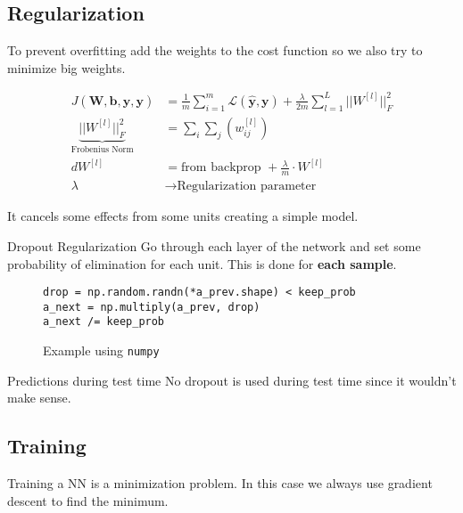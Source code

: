 \subsection{Regularization}
\begin{frame}{\insertsubsec}
    To prevent overfitting add the weights to the cost function so we also try to minimize
    big weights.

    \begin{align*}
        J(\bm{W}, \bm{b}, \hat{\bm{y}}, \bm{y}) &= 
        \frac{1}{m} \sum_{i = 1}^m \mathcal{L}(\hat{\bm{y}}, \bm{y}) + 
        \frac{\lambda}{2m} \sum_{l=1}^L ||W^{[l]}||^2_F \\ 
        \underbrace{||W^{[l]}||^2_F}_{\text{Frobenius Norm}} &= \sum_i \sum_j (w_{ij}^{[l]}) \\ 
        dW^{[l]} &= \text{from backprop } + \frac{\lambda}{m} \cdot W^{[l]} \\
        \lambda &\rightarrow \text{Regularization parameter}
    \end{align*}

    It cancels some effects from some units creating a simple model.
\end{frame}
\begin{frame}[fragile]{Dropout Regularization}
    Go through each layer of the network and set some probability of elimination for each unit. 
    This is done for \textbf{each sample}.

    \begin{figure}
        \begin{verbatim}
drop = np.random.randn(*a_prev.shape) < keep_prob
a_next = np.multiply(a_prev, drop)
a_next /= keep_prob
        \end{verbatim}
        \caption{Example using \texttt{numpy}}
    \end{figure}

    \begin{alertblock}{Predictions during test time}
        No dropout is used during test time since it wouldn't make sense.
    \end{alertblock}
\end{frame}

\subsection{Training}
\begin{frame}{\insertsubsec}
    Training a NN is a minimization problem. In this case we always use gradient descent
    to find the minimum.
\end{frame}

